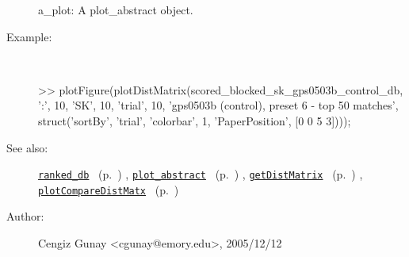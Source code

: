 \begin{description}
	a\_plot: A plot\_abstract object.
%
\item[Example:]~
\begin{lyxcode} >> plotFigure(plotDistMatrix(scored\_blocked\_sk\_gps0503b\_control\_db, ':', 10, 'SK', 10, 'trial', 10, 'gps0503b (control), preset 6 - top 50 matches', struct('sortBy', 'trial', 'colorbar', 1, 'PaperPosition', [0 0 5 3])));
\\%
\end{lyxcode}
%
\item[See also:]%
\hyperlink{ref_ranked_db}{\texttt{ranked\_db}}%
\ (p.~\pageref{ref_ranked_db})%
%
, \hyperlink{ref_plot_abstract}{\texttt{plot\_abstract}}%
\ (p.~\pageref{ref_plot_abstract})%
%
, \hyperlink{ref_getDistMatrix}{\texttt{getDistMatrix}}%
\ (p.~\pageref{ref_getDistMatrix})%
%
, \hyperlink{ref_plotCompareDistMatx}{\texttt{plotCompareDistMatx}}%
\ (p.~\pageref{ref_plotCompareDistMatx})%
%
%
\item[Author:]%
Cengiz Gunay <cgunay@emory.edu>, 2005/12/12
%
\end{description}
\methodline%
